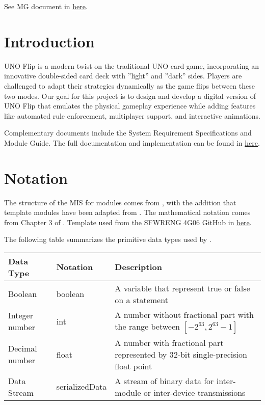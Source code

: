 \documentclass[12pt, titlepage]{article}
\begin{document}
See MG document in \href{https://github.com/simon-0215/UNO-Flip-3D/blob/main/docs/Design/SoftArchitecture/MG.pdf}{here}.


\newpage

\tableofcontents

\newpage


\section{Introduction}

UNO Flip is a modern twist on the traditional UNO card game, incorporating an innovative double-sided card deck with ”light” and ”dark” sides. Players are challenged to adapt their strategies dynamically as the game flips between these two modes. Our goal for this project is to design and develop a digital version of UNO Flip that emulates the physical gameplay experience while adding features like automated rule enforcement, multiplayer support, and interactive animations.

Complementary documents include the System Requirement Specifications and Module Guide. The full documentation and implementation can be found in \href{https://github.com/simon-0215/UNO-Flip-3D/tree/main}{here}. 


\section{Notation}



The structure of the MIS for modules comes from \citet{HoffmanAndStrooper1995},
with the addition that template modules have been adapted from
\cite{GhezziEtAl2003}.  The mathematical notation comes from Chapter 3 of
\citet{HoffmanAndStrooper1995}. Template used from the SFWRENG 4G06 GitHub in \href{https://github.com/smiths/capTemplate/tree/main/docs/Design/SoftDetailedDes}{here}. 

The following table summarizes the primitive data types used by . 

\begin{center}
\renewcommand{\arraystretch}{1.2}
\noindent 
\begin{tabular}{l l p{7.5cm}} 
\toprule 
\textbf{Data Type} & \textbf{Notation} & \textbf{Description}\\ 
\midrule
Boolean & boolean & A variable that represent true or false on a statement \\
Integer number & int & A number without fractional part with the range between $[-2^{63}, 2^{63}-1]$\\
Decimal number & float & A number with fractional part represented by 32-bit single-precision float point\\
Data Stream & serializedData & A stream of binary data for inter-module or inter-device transmissions\\
\bottomrule
\end{tabular} 
\end{center}
\end{document}
